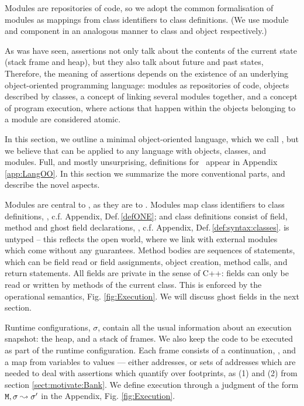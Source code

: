\renewcommand{\appref}[1]{, c.f. Appendix, Def.\,\ref{#1}}

Modules are repositories of code, so we adopt the common formalisation 
of modules as  mappings from
class identifiers to class definitions.
(We use module and component in an analogous manner to class and object respectively.)

 
As was have seen, \Chainmail assertions not only talk about the contents of the current state (stack frame and heap),
but they also talk about future and past states, Therefore, the meaning of \Chainmail assertions depends on the existence of an
underlying object-oriented programming language: modules as repositories of code, objects described by classes,
a concept of linking several modules together, and a concept of 
program execution, where  actions that happen within the objects belonging to a module are considered atomic.

In this section, we outline a minimal object-oriented language, which we call  \LangOO, 
but we believe that \Chainmail can be applied to 
any language with objects, classes, and modules.
Full, and mostly unsurprising,
 definitions for  \LangOO~appear in Appendix \ref{app:LangOO}. 
In this section we summarize the more conventional parts, and describe the novel aspects. 

Modules are central to \LangOO, as they are to \Chainmail. Modules map
class identifiers to class definitions, \appref{defONE}; and class
definitions consist of field, method and ghost field declarations,
\appref{def:syntax:classes}.  \LangOO is untyped -- this reflects the
open world, where we link with external modules which come without any
guarantees.
Method bodies are sequences of 
statements, which  can be field read or field assignments, object
creation, method calls, and return statements. 
All fields are private in the sense of C++: fields can only be read or
written by methods of the current class.
This is enforced by the operational semantics, \cf Fig.  \ref{fig:Execution}.
We will discuss ghost fields in the next section.

Runtime configurations, $\sigma$,  contain   all the usual information about an execution snapshot: the heap, and a
stack of frames. We also keep the code to be executed as part of the runtime configuration.
%
Each frame consists of a continuation, , and a map from
variables to values --- either addresses, or sets of addresses which
are needed to deal with assertions which quantify over footprints, as
\eg (1) and (2) from section \ref{sect:motivate:Bank}.
% 
We define execution  through a judgment of the form ${\mbox{\tt{\ensuremath{{\mbox{\tt{M}}}}}}}, \sigma \leadsto \sigma'$ in the Appendix, Fig.  \ref{fig:Execution}. 
%
  

